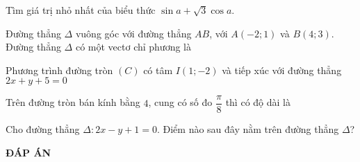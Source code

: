 \begin{ex}%
Tìm giá trị nhỏ nhất của biểu thức  $\sin a + \sqrt 3 \cos a$.
\end{ex}

\begin{ex}%
Đường thẳng $\Delta$ vuông góc với đường thẳng $AB$, với $A(-2;1)$ và $B(4;3)$. Đường thẳng $\Delta$ có một vectơ chỉ phương là
\end{ex}

\begin{ex}%
Phương trình đường tròn $(C)$ có tâm $I(1;-2)$ và tiếp xúc với đường thẳng $2x+y+5=0$
\end{ex}

\begin{ex}%
Trên đường tròn bán kính bằng $4$, cung có số đo $\dfrac{\pi}{8}$ thì có độ dài là
\end{ex}

\begin{ex}%
Cho đường thẳng $\Delta: 2x-y+1=0$. Điểm nào sau đây nằm trên đường thẳng $\Delta$?
\end{ex}



\newpage
\begin{center}
	\textbf{ĐÁP ÁN}
\end{center}
\begin{multicols}{10}
	 
\end{multicols}


